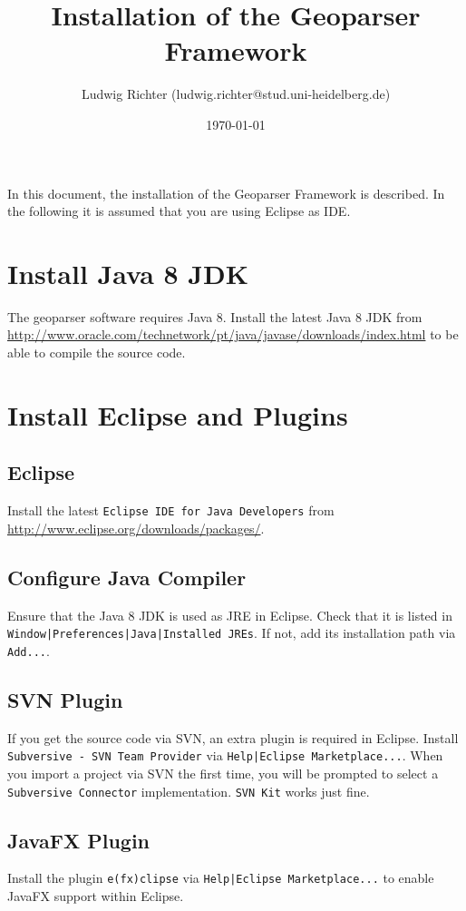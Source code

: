 \documentclass[fontsize=12pt, BCOR=10mm, DIV=14, parskip=true,headings=small]{scrartcl}
\title{Installation of the Geoparser Framework}
\author{Ludwig Richter (ludwig.richter@stud.uni-heidelberg.de)}
\date{\today}
\begin{document}
\maketitle

In this document, the installation of the Geoparser Framework is described. In the following it is assumed that you are using Eclipse as IDE.

\section{Install Java 8 JDK}

The geoparser software requires Java 8. Install the latest Java 8 JDK from \url{http://www.oracle.com/technetwork/pt/java/javase/downloads/index.html}
to be able to compile the source code.

\section{Install Eclipse and Plugins}

\subsection{Eclipse}
Install the latest \texttt{Eclipse IDE for Java Developers} from \url{http://www.eclipse.org/downloads/packages/}.

\subsection{Configure Java Compiler}
Ensure that the Java 8 JDK is used as JRE in Eclipse. Check that it is listed in \texttt{Window|\-Preferences|Java|Installed JREs}. If not, add its installation path via \texttt{Add...}. 

\subsection{SVN Plugin}
If you get the source code via SVN, an extra plugin is required in Eclipse. Install \texttt{Subversive - SVN Team Provider} via \texttt{Help\-|Eclipse\- Marketplace...}. When you import a project via SVN the first time, you will be prompted to select a \texttt{Subversive Connector} implementation. \texttt{SVN Kit} works just fine.

\subsection{JavaFX Plugin}
Install the plugin \texttt{e(fx)clipse}  via \texttt{Help|Eclipse Marketplace...} to enable JavaFX support within Eclipse.
\end{document}
